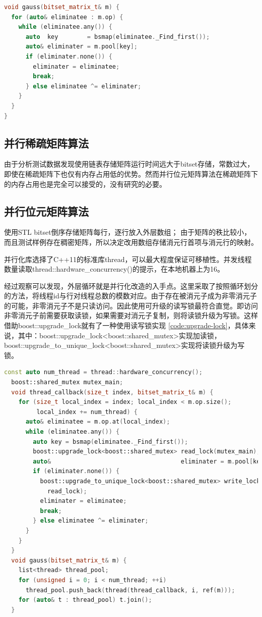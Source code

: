 \documentclass[a4paper]{article}
\begin{document}
\begin{lstlisting}[frame=trbl, language={C++}, caption={串行位元矩阵消元部分}]
void gauss(bitset_matrix_t& m) {
  for (auto& eliminatee : m.op) {
    while (eliminatee.any()) {
      auto  key        = bsmap(eliminatee._Find_first());
      auto& eliminater = m.pool[key];
      if (eliminater.none()) {
        eliminater = eliminatee;
        break;
      } else eliminatee ^= eliminater;
    }
  }
}
\end{lstlisting}

\subsection{并行稀疏矩阵算法}
由于分析测试数据发现使用链表存储矩阵运行时间远大于bitset存储，常数过大，即使在稀疏矩阵下也仅有内存占用低的优势。然而并行位元矩阵算法在稀疏矩阵下的内存占用也是完全可以接受的，没有研究的必要。

\subsection{并行位元矩阵算法}
使用STL bitset倒序存储矩阵每行，逐行放入外层数组；
由于矩阵的秩比较小，而且测试样例存在稠密矩阵，所以决定改用数组存储消元行首项与消元行的映射。

并行化库选择了C++11的标准库thread，可以最大程度保证可移植性。并发线程数量读取thread::hardware\_concurrency()的提示，在本地机器上为16。

经过观察可以发现，外层循环就是并行化改造的入手点。这里采取了按照循环划分的方法，将线程id与行对线程总数的模数对应。由于存在被消元子成为非零消元子的可能，非零消元子不是只读访问。因此使用可升级的读写锁最符合直觉。即访问非零消元子前需要获取读锁，如果需要对消元子复制，则将读锁升级为写锁。这样借助boost::upgrade\_lock就有了一种使用读写锁实现 \ref{code:upgrade-lock}，具体来说，其中：boost::upgrade\_lock<boost::shared\_mutex>实现加读锁，boost::upgrade\_to\_unique\_lock<boost::shared\_mutex>实现将读锁升级为写锁。

\begin{lstlisting}[frame=trbl, language={C++}, caption={upgrade\_lock 位元矩阵消元部分}, label={code:upgrade-lock}]
  const auto num_thread = thread::hardware_concurrency();
  boost::shared_mutex mutex_main;
  void thread_callback(size_t index, bitset_matrix_t& m) {
    for (size_t local_index = index; local_index < m.op.size();
         local_index += num_thread) {
      auto& eliminatee = m.op.at(local_index);
      while (eliminatee.any()) {
        auto key = bsmap(eliminatee._Find_first());
        boost::upgrade_lock<boost::shared_mutex> read_lock(mutex_main);
        auto&                                    eliminater = m.pool[key];
        if (eliminater.none()) {
          boost::upgrade_to_unique_lock<boost::shared_mutex> write_lock(
            read_lock);
          eliminater = eliminatee;
          break;
        } else eliminatee ^= eliminater;
      }
    }
  }
  void gauss(bitset_matrix_t& m) {
    list<thread> thread_pool;
    for (unsigned i = 0; i < num_thread; ++i)
      thread_pool.push_back(thread(thread_callback, i, ref(m)));
    for (auto& t : thread_pool) t.join();
  }
\end{lstlisting}
\end{document}
